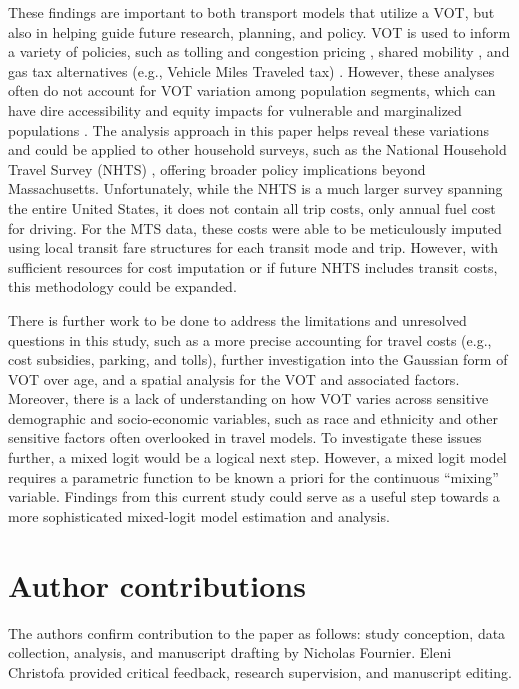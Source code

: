 \documentclass[numbered]{trbunofficial}\usepackage[]{graphicx}\usepackage[]{color}
\begin{document}
These findings are important to both transport models that utilize a VOT, but also in helping guide future research, planning, and policy. VOT is used to inform a variety of policies, such as tolling and congestion pricing \citep{Santos2006, Kockelman2005}, shared mobility \citep{Jiao2020}, and gas tax alternatives (e.g., Vehicle Miles Traveled tax) \citep{StarrMcMullen2010}. However, these analyses often do not account for VOT variation among population segments, which can have dire accessibility and equity impacts for vulnerable and marginalized populations \citep{Probst2007,Hossinger2020,Larsen2012}. The analysis approach in this paper helps reveal these variations and could be applied to other household surveys, such as the National Household Travel Survey (NHTS) \citep{NHTS2017}, offering broader policy implications beyond Massachusetts. Unfortunately, while the NHTS is a much larger survey spanning the entire United States, it does not contain all trip costs, only annual fuel cost for driving. For the MTS data, these costs were able to be meticulously imputed using local transit fare structures for each transit mode and trip. However, with sufficient resources for cost imputation or if future NHTS includes transit costs, this methodology could be expanded. 

There is further work to be done to address the limitations and unresolved questions in this study, such as a more precise accounting for travel costs (e.g., cost subsidies, parking, and tolls), further investigation into the Gaussian form of VOT over age, and a spatial analysis for the VOT and associated factors. Moreover, there is a lack of understanding on how VOT varies across sensitive demographic and socio-economic variables, such as race and ethnicity and other sensitive factors often overlooked in travel models. To investigate these issues further, a mixed logit would be a logical next step. However, a mixed logit model requires a parametric function to be known a priori for the continuous ``mixing'' variable. Findings from this current study could serve as a useful step towards a more sophisticated mixed-logit model estimation and analysis.


\section{Author contributions}
The authors confirm contribution to the paper as follows: study conception, data collection, analysis, and manuscript drafting by Nicholas Fournier. Eleni Christofa provided critical feedback, research supervision, and manuscript editing.
\end{document}
